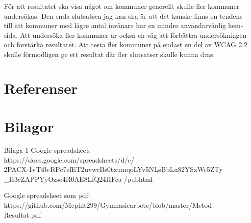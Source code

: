 \documentclass[11p]{article}
\begin{document}
\begin{otherlanguage}{swedish}
    För att resultatet ska visa något om kommuner generellt skulle fler kommuner undersökas.
    Den enda slutsatsen jag kan dra är att det kanske finns en tendens till att kommuner med lägre antal invånare har en mindre användarvänlig hemsida.
    Att undersöka fler kommuner är också en väg att förbättra undersökningen och förstärka resultatet.
    Att testa fler kommuner på endast en del av WCAG 2.2 skulle förmodligen ge ett resultat där fler slutsatser skulle kunna dras.

    \newpage
    \section{Referenser}

    \printbibliography[heading=none]

    \newpage
    \section{Bilagor}
    Bilaga 1
    Google spreadsheet:
    \\ https://docs.google.com/spreadsheets/d/e/
    \\2PACX-1vT4b-RPc7sfET2uvwcBs0txumqoLYv5NLsBbLu82YSxWc5ZTy
    \\\_H3eZAPPYyOzse4R0AE8LfQ24HFca-/pubhtml

    Google spreadsheet som pdf:
    \\https://github.com/Mephit299/Gymnasiearbete/blob/master/Metod-Resultat.pdf

    \end{otherlanguage}
\end{document}
